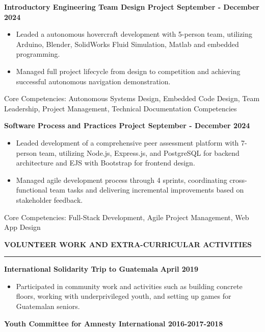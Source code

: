 \documentclass[letterpaper,11pt]{article}
\begin{document}
\textbf{Introductory Engineering Team Design Project \hfill September - December 2024}
\begin{itemize}
\setlength{\itemsep}{-3pt}
\item
Leaded a autonomous hovercraft development with 5-person team, utilizing Arduino, Blender, SolidWorks Fluid Simulation, Matlab and embedded programming.
\item
Managed full project lifecycle from design to competition and achieving successful autonomous navigation demonstration.
\end{itemize}
Core Competencies: Autonomous Systems Design, Embedded Code Design, Team Leadership, Project Management, Technical Documentation
Competencies

\textbf{Software Process and Practices Project \hfill September - December 2024}

\begin{itemize}
\setlength{\itemsep}{-3pt}
\item
Leaded development of a comprehensive peer assessment platform with 7-person team, utilizing Node.js,
Express.js, and PostgreSQL for backend architecture and EJS with Bootstrap for frontend design.
\item
Managed agile development process through 4 sprints, coordinating cross-functional team tasks
and delivering incremental improvements based on stakeholder feedback.
\end{itemize}
Core Competencies: Full-Stack Development, Agile Project Management, Web App Design

\textbf{VOLUNTEER WORK AND EXTRA-CURRICULAR ACTIVITIES}\par
\vspace{-20pt}
\rule{\textwidth}{0.4pt}
\textbf{International Solidarity Trip to Guatemala} \hfill \textbf{April 2019}

\begin{itemize}
\setlength{\itemsep}{-3pt}
\item
  Participated in community work and activities such as building
  concrete floors, working with underprivileged youth, and setting up
  games for Guatemalan seniors.
\end{itemize}

\textbf{Youth Committee for Amnesty International \hfill 2016-2017-2018}
\end{document}
